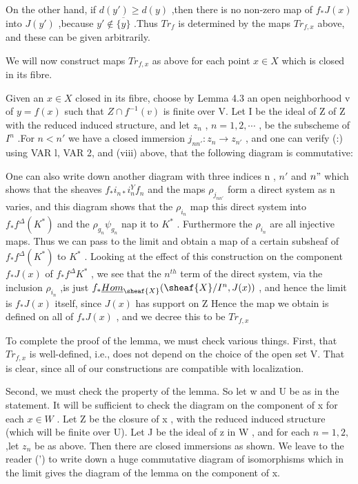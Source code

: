 \documentclass[12pt]{book}
\begin{document}
On the other hand, if \(d(y') \ge d(y)\) ,then there is no non-zero map of \(f_{*} J(x)\) into \(J(y')\) ,because \(y' \notin \overline{\{y\}}\) .Thus \(Tr_{f}\) is determined by the maps \(Tr_{f, x}\) above, and these can be given arbitrarily.

We will now construct maps \(Tr_{f, x}\) as above for each point \(x \in X\) which is closed in its fibre.

\setcounter{page}{346}
Given an \(x \in X\) closed in its fibre, choose by Lemma 4.3 an open neighborhood v of \(y=f(x)\) such that \(Z \cap f^{-1}(v)\) is finite over V. Let I be the ideal of Z of Z with the reduced induced structure, and let \(z_{n}\) , \(n=1,2, \cdots\) , be the subscheme of
\(I^{n}\) .For \(n<n'\) we have a closed immersion \(j_{n n'}: z_{n} \to z_{n'}\) , and one can verify (:) using VAR l, VAR 2, and (viii) above, that the following diagram is commutative:

One can also write down another diagram with three indices n , \(n'\) and \(n "\) which shows that the sheaves \(f_{*} i_{n *} i_{n}^{Y} f_{n}\) and the maps \(\rho_{j_{n n'}}\) form a direct system as n varies, and this diagram shows that the \(\rho_{i_{n}}\) map this direct system into \(f_{*} f^{\Delta}(K^{*})\) and the \(\rho_{g_{n}} \psi_{g_{n}}\) nap it to \(K^{*}\) . Furthermore the \(\rho_{i_{n}}\) are all injective maps. Thus we can pass to the limit and obtain a map of a certain subsheaf of \(f_{*} f^{\Delta}(K^{*})\) to \(K^{*}\) . Looking at the effect of this construction on the component \(f_{*} J(x)\) of \(f_{*} f^{\Delta} K^{*}\) , we see that the \(n^{th }\) term of the direct system, via the inclusion \(\rho_{i_{n}}\) ,is just \(f_{*} \underline{Hom}_{\sheaf{X}}(\sheaf{X} / I^{n}, J(x))\) , and hence the limit is \(f_{*} J(x)\) itself, since \(J(x)\) has support on Z Hence the map we obtain is defined on all of \(f_{*} J(x)\) , and we decree this to be \(Tr_{f, x}\)

\setcounter{page}{347}
To complete the proof of the lemma, we must check various things. First, that \(Tr_{f, x}\) is well-defined, i.e., does not depend on the choice of the open set V. That is clear, since all of our constructions are compatible with localization.

Second, we must check the property of the lemma. So let w and U be as in the statement. It will be sufficient to check the diagram on the component of x for each \(x \in W\) . Let Z be the closure of x , with the reduced induced structure (which will be finite over U). Let J be the ideal of z in W , and for each \(n=1,2,\) ,let \(z_{n}\) be as above. Then there are closed immersions as shown. We leave to the reader (') to write down a huge commutative diagram of isomorphisms which in the limit gives the diagram of the lemma on the component of x.
\end{document}
